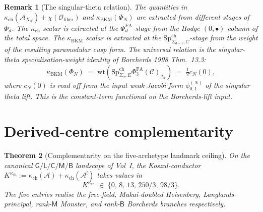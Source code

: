 \documentclass[11pt]{article}
\newtheorem{theorem}{Theorem}[section]
\newtheorem{remark}[theorem]{Remark}
\newcommand{\cO}{\mathcal{O}}
\newcommand{\cA}{\mathcal{A}}
\newcommand{\cC}{\mathcal{C}}
\newcommand{\wt}{\mathrm{wt}}
\begin{document}
\begin{remark}[The singular-theta relation]
\label{rem:true-relation}
The quantities in
$\kappa_{\mathrm{ch}}(\cA_{X_N})+\chi(\cO_{\mathrm{fiber}})$ and
$\kappa_{\mathrm{BKM}}(\Phi_N)$ are extracted from different stages of
$\Phi_d$. The $\kappa_{\mathrm{ch}}$ scalar is extracted at the
$\Phi^{\mathrm{FA}}_d$-stage from the Hodge $(0,\bullet)$-column of the
total space. The $\kappa_{\mathrm{BKM}}$ scalar is extracted at the
$\mathrm{Sp}^{\mathrm{ch}}_{\Sigma_{d-1},C}$-stage from the weight of
the resulting paramodular cusp form. The universal relation is the
\emph{singular-theta specialisation-weight identity} of Borcherds
1998 Thm.~13.3:
\[
  \kappa_{\mathrm{BKM}}(\Phi_N)
  \;=\;
  \wt(\mathrm{Sp}^{\mathrm{ch}}_{\Sigma_2,E}\Phi^{\mathrm{FA}}_3(\cC)_{g_N})
  \;=\;
  \tfrac{1}{2}c_N(0),
\]
where $c_N(0)$ is read off from the input weak Jacobi form
$\phi_{0,1}^{(N)}$ of the singular theta lift. This is the
constant-term functional on the \emph{Borcherds-lift} input.
\end{remark}

\section{Derived-centre complementarity}
\label{sec:derived-centre-complementarity}

\begin{theorem}[Complementarity on the five-archetype landmark ceiling]
\label{thm:theorem-c-five-archetype}
On the canonical $\mathsf{G}/\mathsf{L}/\mathsf{C}/\mathsf{M}/\mathsf{B}$
landscape of Vol~I, the Koszul-conductor
$K^{\kappa_{\mathrm{ch}}}:=\kappa_{\mathrm{ch}}(\cA)+\kappa_{\mathrm{ch}}(\cA^{!})$
takes values in
\[
  K^{\kappa_{\mathrm{ch}}}
  \;\in\;
  \{0,\,8,\,13,\,250/3,\,98/3\}.
\]
The five entries realise the free-field, Mukai-doubled Heisenberg,
Langlands-principal, rank-$\mathsf{M}$ Monster, and rank-$\mathsf{B}$
Borcherds branches respectively.
\end{theorem}
\end{document}

